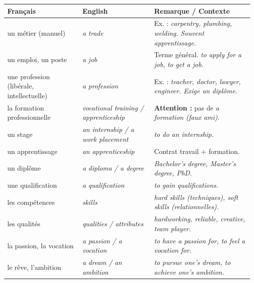 \documentclass[11pt]{article}
\newcommand{\eng}[1]{\ifmmode\text{\textit{#1}}\else\begingroup\selectlanguage{english}\itshape #1\endgroup\fi}
\begin{document}
\begin{aretenir}
\begin{center}
\begin{tabularx}{\linewidth}{|X|X|X|}
\hline
\rowcolor{popblueL} \textbf{Français} & \textbf{English} & \textbf{Remarque / Contexte} \\
\hline
un métier (manuel) & \eng{a trade} & Ex. : \eng{carpentry, plumbing, welding}. Souvent apprentissage. \\
\hline
un emploi, un poste & \eng{a job} & Terme général. \eng{to apply for a job}, \eng{to get a job}. \\
\hline
une profession (libérale, intellectuelle) & \eng{a profession} & Ex. : \eng{teacher, doctor, lawyer, engineer}. Exige un diplôme. \\
\hline
la formation professionnelle & \eng{vocational training} / \eng{apprenticeship} & \textbf{Attention :} pas de \eng{a formation} (faux ami). \\
\hline
un stage & \eng{an internship} / \eng{a work placement} & \eng{to do an internship}. \\
\hline
un apprentissage & \eng{an apprenticeship} & Contrat travail + formation. \\
\hline
un diplôme & \eng{a diploma} / \eng{a degree} & \eng{Bachelor's degree, Master's degree, PhD}. \\
\hline
une qualification & \eng{a qualification} & \eng{to gain qualifications}. \\
\hline
les compétences & \eng{skills} & \eng{hard skills} (techniques), \eng{soft skills} (relationnelles). \\
\hline
les qualités & \eng{qualities} / \eng{attributes} & \eng{hardworking, reliable, creative, team player}. \\
\hline
la passion, la vocation & \eng{a passion} / \eng{a vocation} & \eng{to have a passion for}, \eng{to feel a vocation for}. \\
\hline
le rêve, l'ambition & \eng{a dream} / \eng{an ambition} & \eng{to pursue one's dream}, \eng{to achieve one's ambition}. \\
\hline
\end{tabularx}
\end{center}


\end{aretenir}
\end{document}

